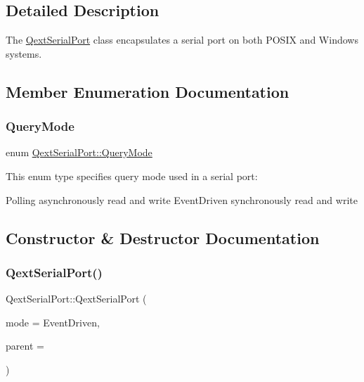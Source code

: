 \subsection{Detailed Description}
The \hyperlink{classQextSerialPort}{Qext\+Serial\+Port} class encapsulates a serial port on both P\+O\+S\+IX and Windows systems. 



\subsection{Member Enumeration Documentation}
\mbox{\label{classQextSerialPort_a6002128d7351ea9a958d6a6d1fc6b9bd}} 
\subsubsection{\texorpdfstring{Query\+Mode}{QueryMode}}
{\footnotesize\ttfamily enum \hyperlink{classQextSerialPort_a6002128d7351ea9a958d6a6d1fc6b9bd}{Qext\+Serial\+Port\+::\+Query\+Mode}}

This enum type specifies query mode used in a serial port\+:

Polling asynchronously read and write  Event\+Driven synchronously read and write 

\subsection{Constructor \& Destructor Documentation}
\mbox{\label{classQextSerialPort_af36bd1a07fc25c3874cbba5a4a1d6b02}} 
\subsubsection{\texorpdfstring{Qext\+Serial\+Port()}{QextSerialPort()}\hspace{0.1cm}{\footnotesize\ttfamily [1/4]}}
{\footnotesize\ttfamily Qext\+Serial\+Port\+::\+Qext\+Serial\+Port (\begin{DoxyParamCaption}\item[{\hyperlink{classQextSerialPort_a6002128d7351ea9a958d6a6d1fc6b9bd}{Qext\+Serial\+Port\+::\+Query\+Mode}}]{mode = {\ttfamily EventDriven},  }\item[{Q\+Object $\ast$}]{parent = {} }\end{DoxyParamCaption})\hspace{0.3cm}{\ttfamily [explicit]}}

